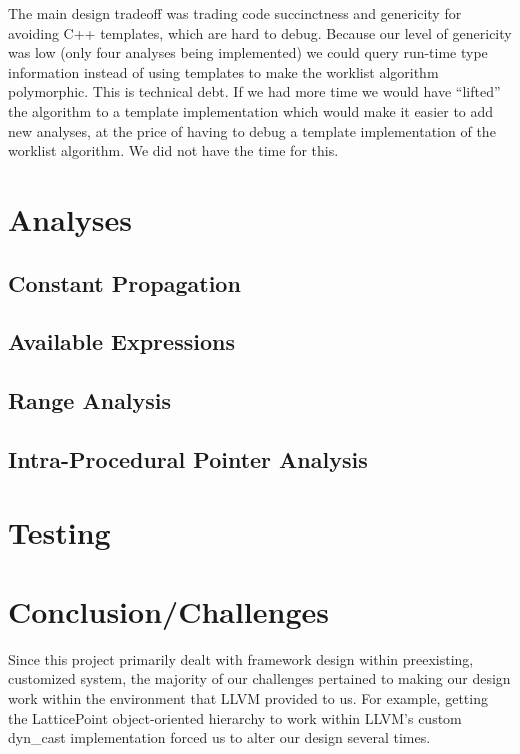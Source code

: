 \documentclass{article}
\theoremstyle{definition}
\begin{document}

The main design tradeoff was trading code succinctness and genericity
for avoiding C++ templates, which are hard to debug. Because our level
of genericity was low (only four analyses being implemented) we could
query run-time type information instead of using templates to make the
worklist algorithm polymorphic. This is technical debt. If we had more
time we would have ``lifted'' the algorithm to a template
implementation which would make it easier to add new analyses, at the
price of having to debug a template implementation of the worklist
algorithm. We did not have the time for this.

\section{Analyses}

\subsection{Constant Propagation}


\subsection{Available Expressions}


\subsection{Range Analysis}



\subsection{Intra-Procedural Pointer Analysis}













\section{Testing}



\section{Conclusion/Challenges}
Since this project primarily dealt with framework design within
preexisting, customized system, the majority of our challenges
pertained to making our design work within the environment that LLVM
provided to us. For example, getting the LatticePoint object-oriented
hierarchy to work within LLVM's custom dyn\_cast implementation forced
us to alter our design several times.
\end{document}
